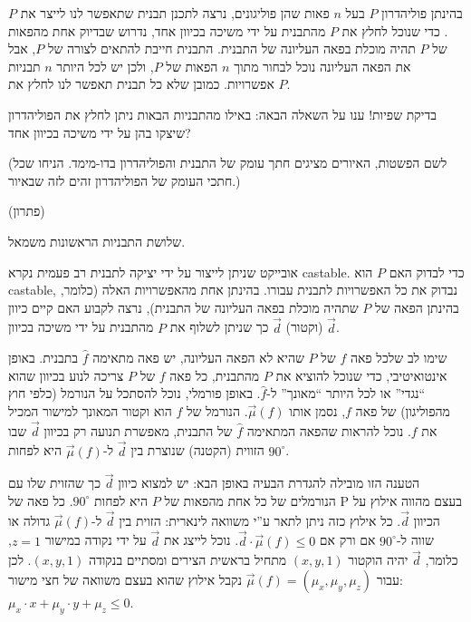 \documentclass[
]{book}
\begin{document}
בהינתן פוליהדרון \(P\) בעל \(n\) פאות שהן פוליגונים, נרצה לתכנן תבנית שתאפשר לנו לייצר את \(P\). כדי שנוכל לחלץ את \(P\) מהתבנית על ידי משיכה בכיוון אחד, נדרוש שבדיוק אחת מהפאות של \(P\) תהיה מוכלת בפאה העליונה של התבנית. התבנית חייבת להתאים לצורה של \(P\), אבל את הפאה העליונה נוכל לבחור מתוך \(n\) הפאות של \(P\), ולכן יש לכל היותר \(n\) תבניות אפשרויות. כמובן שלא כל תבנית תאפשר לנו לחלץ את \(P\).

בדיקת שפיות! ענו על השאלה הבאה: באילו מהתבניות הבאות ניתן לחלץ את הפוליהדרון שיצקו בהן על ידי משיכה בכיוון אחד?

(לשם הפשטות, האיורים מציגים חתך עומק של התבנית והפוליהדרון בדו-מימד. הניחו שכל חתכי העומק של הפוליהדרון זהים לזה שבאיור.)

(פתרון)

שלושת התבניות הראשונות משמאל.

אובייקט שניתן לייצור על ידי יציקה לתבנית רב פעמית נקרא castable. כדי לבדוק האם \(P\) הוא castable, נבדוק את כל האפשרויות לתבנית עבורו. בהינתן אחת מהאפשרויות האלה (כלומר, בהינתן הפאה של \(P\) שתהיה מוכלת בפאה העליונה של התבנית), נרצה לקבוע האם קיים כיוון (וקטור) \(\overrightarrow{d}\) כך שניתן לשלוף את \(P\) מהתבנית על ידי משיכה בכיוון \(\overrightarrow{d}\).

שימו לב שלכל פאה \(f\) של \(P\) שהיא לא הפאה העליונה, יש פאה מתאימה \(\hat{f}\) בתבנית. באופן אינטואיטיבי, כדי שנוכל להוציא את \(P\) מהתבנית, כל פאה \(f\) של \(P\) צריכה לנוע בכיוון שהוא ``נגדי'' או לכל היותר ``מאונך'' ל-\(\hat{f}\). באופן פורמלי, נוכל להסתכל על הנורמל (כלפי חוץ מהפוליגון) של פאה \(f\), נסמן אותו \(\overrightarrow{\mu}( f )\). הנורמל של \(f\) הוא וקטור המאונך למישור המכיל את \(f\). נוכל להראות שהפאה המתאימה \(\hat{f}\) של התבנית, מאפשרת תנועה רק בכיוון \(\overrightarrow{d}\) שבו הזווית (הקטנה) שנוצרת בין \(\overrightarrow{d}\) ל-\(\overrightarrow{\mu}( f )\) היא לפחות \(90 ^\circ\).

הטענה הזו מובילה להגדרת הבעיה באופן הבא: יש למצוא כיוון \(\overrightarrow{d}\) כך שהזוית שלו עם הנורמלים של כל אחת מהפאות של \(P\) היא לפחות \(90 ^\circ\). כל פאה של P בעצם מהווה אילוץ על הכיוון \(\overrightarrow{d}\). כל אילוץ כזה ניתן לתאר ע''י משוואה לינארית: הזוית בין \(\overrightarrow{d}\) ל-\(\overrightarrow{\mu}( f )\) גדולה או שווה ל-\(90 ^\circ\) אם ורק אם \(\overrightarrow{d} \cdot \overrightarrow{\mu}( f ) \le 0\). נוכל לייצג את \(\overrightarrow{d}\) על ידי נקודה במישור \(z = 1\), כלומר, \(\overrightarrow{d}\) יהיה הוקטור \((x,y,1)\) מתחיל בראשית הצירים ומסתיים בנקודה \((x, y, 1 )\). לכן עבור \(\overrightarrow{\mu}( f ) =( \mu_x, \mu_y, \mu_z )\) נקבל אילוץ שהוא בעצם משוואה של חצי מישור: \(\mu_x \cdot x + \mu_y \cdot y + \mu_z \le 0\).
\end{document}
